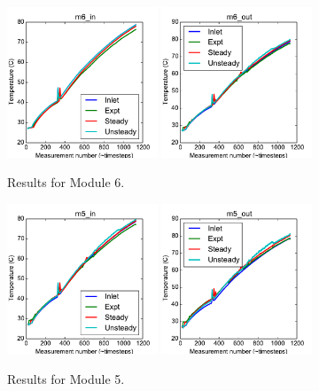 \documentclass{article}
\begin{document}
\begin{figure}[!ht]
\centering
\includegraphics[width=0.4\textwidth]{../../data/ICSolar/images/Feb27_m6_in_compare.pdf}\hspace{0.05\textwidth}
\includegraphics[width=0.4\textwidth]{../../data/ICSolar/images/Feb27_m6_out_compare.pdf}\hspace{0.05\textwidth}\\
\caption{Results for Module 6.}\end{figure}
\begin{figure}[!ht]
\centering
\includegraphics[width=0.4\textwidth]{../../data/ICSolar/images/Feb27_m5_in_compare.pdf}\hspace{0.05\textwidth}
\includegraphics[width=0.4\textwidth]{../../data/ICSolar/images/Feb27_m5_out_compare.pdf}\hspace{0.05\textwidth}\\
\caption{Results for Module 5.}\end{figure}
\end{document}
